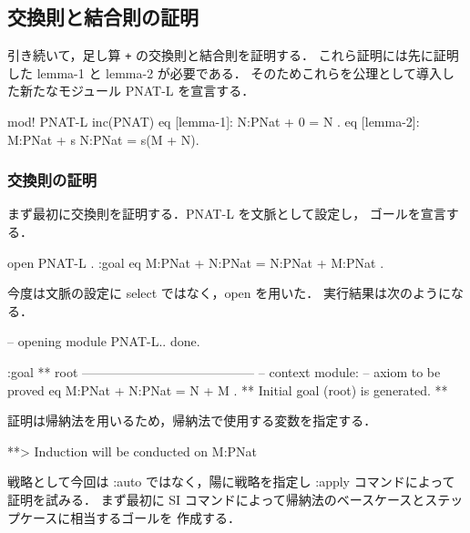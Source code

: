 \documentclass[a4paper,oneside,10pt,here]{memoir}
\newenvironment{vvtm}%
{\parskip=0pt\lineskip=0pt\begin{center}\begin{minipage}{0.8\textwidth}\begin{snugshade}}%
  {\end{snugshade}\end{minipage}\end{center}}
\begin{document}
\subsection{交換則と結合則の証明}
引き続いて，足し算 \texttt{+} の交換則と結合則を証明する．
これら証明には先に証明した lemma-1 と lemma-2 が必要である．
そのためこれらを公理として導入した新たなモジュール PNAT-L を宣言する．

\begin{vvtm}
  \begin{simplev}
mod! PNAT-L {
  inc(PNAT)
  eq [lemma-1]: N:PNat + 0 = N .
  eq [lemma-2]: M:PNat + s N:PNat = s(M + N). 
}
  \end{simplev}
\end{vvtm}

\subsubsection{交換則の証明}

まず最初に交換則を証明する．PNAT-L を文脈として設定し，
ゴールを宣言する．
\begin{vvtm}
  \begin{simplev}
open PNAT-L .
:goal { eq M:PNat + N:PNat = N:PNat + M:PNat . }
  \end{simplev}
\end{vvtm}
今度は文脈の設定に select ではなく，open を用いた．
実行結果は次のようになる．
\begin{vvtm}
  \begin{simplev}
-- opening module PNAT-L.. done.

:goal { ** root -----------------------------------------
  -- context module: %
  -- axiom to be proved
    eq M:PNat + N:PNat = N + M .
}
** Initial goal (root) is generated. **
  \end{simplev}
\end{vvtm}

証明は帰納法を用いるため，帰納法で使用する変数を指定する．
\begin{vvtm}
  \begin{simplev}
**> Induction will be conducted on M:PNat 
  \end{simplev}
\end{vvtm}

戦略として今回は :auto ではなく，陽に戦略を指定し :apply コマンドによって証明を試みる．
まず最初に SI コマンドによって帰納法のベースケースとステップケースに相当するゴールを
作成する．
\end{document}
